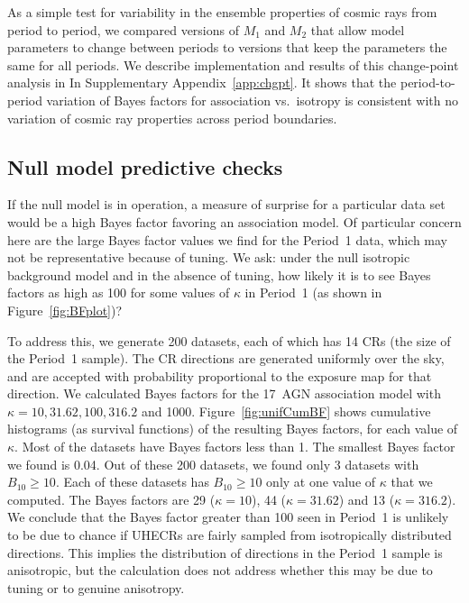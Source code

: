 As a simple test for variability in the ensemble properties of cosmic rays
from period to period, we compared versions of $M_1$ and $M_2$ that allow
model parameters to change between periods to versions that keep the
parameters the same for all periods.  We describe implementation and results
of this change-point analysis in In Supplementary Appendix~\ref{app:chgpt}.  
It shows that the period-to-period variation of Bayes factors for
association vs.\ isotropy is consistent with no variation of cosmic ray
properties across period boundaries.

\subsection{Null model predictive checks}

If the null model is in operation, a measure of surprise for a particular data
set would be a high Bayes factor favoring an association model.  Of particular
concern here are the large Bayes factor values we find for the Period~1 data,
which may not be representative because of tuning.  We ask:  under the null
isotropic background model and in the absence of tuning, how likely it is to
see Bayes factors as high as 100 for some values of $\kappa$ in Period~1 (as
shown in Figure~\ref{fig:BFplot})?

To address this, we generate 200 datasets, each of which has 14 CRs (the
size of the Period~1 sample).  The CR
directions are generated uniformly over the sky, and are accepted with
probability proportional to the exposure map for that direction.  We
calculated Bayes factors for the 17~AGN association model with $\kappa = 10,
31.62, 100, 316.2$ and 1000.
Figure~\ref{fig:unifCumBF} shows cumulative histograms (as survival
functions) of the resulting Bayes factors, for each value of $\kappa$.  Most
of the datasets have Bayes factors less than 1. The smallest Bayes factor we
found is 0.04. Out of these 200 datasets, we found only 3 datasets with
$B_{10} \geq 10$.  Each of these datasets has $B_{10} \geq 10$ only at one
value of $\kappa$ that we computed. The Bayes factors are 29 ($\kappa=10$),
44 ($\kappa = 31.62$) and 13 ($\kappa = 316.2$).  We conclude that the Bayes
factor greater than 100 seen in Period~1 is unlikely to be due to chance if
UHECRs are fairly sampled from isotropically distributed directions.  This
implies the distribution of directions in the Period~1 sample is
anisotropic, but the calculation does not address whether this may be due to
tuning or to genuine anisotropy.


